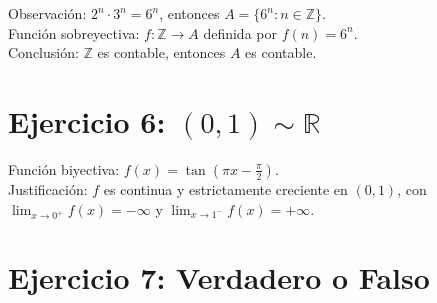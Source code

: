 \documentclass[12pt,a4paper]{article}
\begin{document}
Observación: $2^n \cdot 3^n = 6^n$, entonces $A = \{6^n : n \in \mathbb{Z}\}$. \\
Función sobreyectiva: $f: \mathbb{Z} \to A$ definida por $f(n) = 6^n$. \\
Conclusión: $\mathbb{Z}$ es contable, entonces $A$ es contable.

\section*{Ejercicio 6: $(0,1) \sim \mathbb{R}$}

Función biyectiva: $f(x) = \tan\left(\pi x - \frac{\pi}{2}\right)$. \\
Justificación: $f$ es continua y estrictamente creciente en $(0,1)$, con $\lim_{x \to 0^+} f(x) = -\infty$ y $\lim_{x \to 1^-} f(x) = +\infty$.

\section*{Ejercicio 7: Verdadero o Falso}
\end{document}
